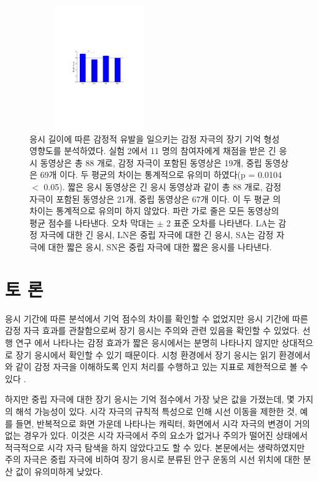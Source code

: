 \documentclass{kcc}
\begin{document}
\begin{figure}
  \centerline{\includegraphics[width=60mm,height=54mm,trim=55mm 108mm 58mm 105mm]{./eps/memtest_nested}}
  \caption{응시 길이에 따른 감정적 유발을 일으키는 감정 자극의 장기 기억 형성 영향도를 분석하였다. 실험 2에서 11 명의 참여자에게 채점을 받은 긴 응시 동영상은 총 88 개로, 감정 자극이 포함된 동영상은 19개, 중립 동영상은 69개 이다. 두 평균의 차이는 통계적으로 유의미 하였다(p = 0.0104 $<$ 0.05). 짧은 응시 동영상은 긴 응시 동영상과 같이 총 88 개로, 감정 자극이 포함된 동영상은 21개, 중립 동영상은 67개 이다. 이 두 평균 의 차이는 통계적으로 유의미 하지 않았다. 파란 가로 줄은 모든 동영상의 평균 점수를 나타낸다. 오차 막대는 $\pm$ 2 표준 오차를 나타낸다. LA는 감정 자극에 대한 긴 응시, LN은 중립 자극에 대한 긴 응시, SA는 감정 자극에 대한 짧은 응시, SN은 중립 자극에 대한 짧은 응시를 나타낸다.}
  \label{fig:memtest-nested}
\end{figure}


\section{토 론}
응시 기간에 따른 분석에서 기억 점수의 차이를 확인할 수 없었지만 응시 기간에 따른 감정 자극 효과를 관찰함으로써 장기 응시는 주의와 관련 있음을 확인할 수 있었다. 선행 연구 \cite{Cahill1996amyg,Cahill1998baso}에서 나타나는 감정 효과가 짧은 응시에서는 분명히 나타나지 않지만 상대적으로 장기 응시에서 확인할 수 있기 때문이다. 시청 환경에서 장기 응시는 읽기 환경에서와 같이 감정 자극을 이해하도록 인지 처리를 수행하고 있는 지표로 제한적으로 볼 수 있다 \cite{Rayner1997}. 

하지만 중립 자극에 대한 장기 응시는 기억 점수에서 가장 낮은 값을 가졌는데, 몇 가지의 해석 가능성이 있다. 시각 자극의 규칙적 특성으로 인해 시선 이동을 제한한 것, 예를 들면, 반복적으로 화면 가운데 나타나는 캐릭터, 화면에서 시각 자극의 변경이 거의 없는 경우가 있다. 이것은 시각 자극에서 주의 요소가 없거나 주의가 떨어진 상태에서 적극적으로 시각 자극 탐색을 하지 않았다고도 할 수 있다. 본문에서는 생략하였지만 주의 자극은 중립 자극에 비하여 장기 응시로 분류된 안구 운동의 시선 위치에 대한 분산 값이 유의미하게 낮았다. 
\end{document}
